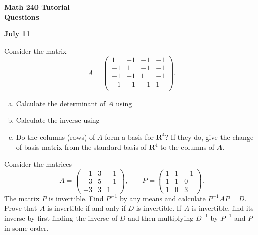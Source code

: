 \documentclass[a4paper,11pt]{article}
\newcommand{\R}{\mathbf{R}}
\begin{document}
\begin{center}
  {\Large\bfseries Math 240 Tutorial \\ Questions}
\end{center}
\begin{center}
  {\bfseries July 11}
\end{center}

 Consider the matrix
\[
  A =
  \left(
    \begin{array}{rrrr}
      1 & -1 & -1 & -1 \\
      -1 & 1 & -1 & -1 \\
      -1 & -1 & 1 & -1 \\
      -1 & -1 & -1 & 1 \\
    \end{array}
  \right).
\]
\begin{enumerate}[(a)]
\item Calculate the determinant of $A$ using
\item Calculate the inverse using
\item Do the columns (rows) of $A$ form a basis for $\R^4$? If they do, give
  the change of basis matrix from the standard basis of $\R^4$ to the columns of
  $A$. \\
\end{enumerate}

 Consider the matrices
\[
  A =
  \left(
    \begin{array}{rrr}
      -1 & 3 & -1 \\
      -3 & 5 & -1 \\
      -3 & 3 & 1
    \end{array}
  \right), \qquad
  P = 
  \left(
    \begin{array}{rrr}
      1 & 1 & -1 \\
      1 & 1 & 0 \\
      1 & 0 & 3
    \end{array}
  \right).
\]
The matrix $P$ is invertible. Find $P^{-1}$ by any means and calculate
$P^{-1}AP=D$. Prove that $A$ is invertible if and only if $D$ is invertible. If
$A$ is invertible, find its inverse by first finding the inverse of $D$ and then
multiplying $D^{-1}$ by $P^{-1}$ and $P$ in some order. \\ 
\end{document}
